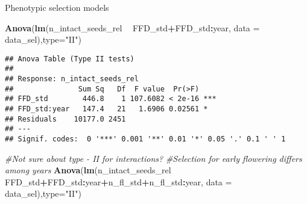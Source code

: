 \documentclass[]{article}
\newenvironment{Shaded}{\begin{snugshade}}{\end{snugshade}}
\newcommand{\KeywordTok}[1]{\textcolor[rgb]{0.13,0.29,0.53}{\textbf{#1}}}
\newcommand{\DataTypeTok}[1]{\textcolor[rgb]{0.13,0.29,0.53}{#1}}
\newcommand{\StringTok}[1]{\textcolor[rgb]{0.31,0.60,0.02}{#1}}
\newcommand{\CommentTok}[1]{\textcolor[rgb]{0.56,0.35,0.01}{\textit{#1}}}
\newcommand{\OperatorTok}[1]{\textcolor[rgb]{0.81,0.36,0.00}{\textbf{#1}}}
\newcommand{\NormalTok}[1]{#1}
\begin{document}
\begin{Shaded}
\end{Shaded}

Phenotypic selection models

\begin{Shaded}
\begin{Highlighting}[]
\KeywordTok{Anova}\NormalTok{(}\KeywordTok{lm}\NormalTok{(n_intact_seeds_rel }\OperatorTok{~}\StringTok{ }\NormalTok{FFD_std}\OperatorTok{+}\NormalTok{FFD_std}\OperatorTok{:}\NormalTok{year, }\DataTypeTok{data =}\NormalTok{ data_sel),}\DataTypeTok{type=}\StringTok{"II"}\NormalTok{) }
\end{Highlighting}
\end{Shaded}

\begin{verbatim}
## Anova Table (Type II tests)
## 
## Response: n_intact_seeds_rel
##               Sum Sq   Df  F value  Pr(>F)    
## FFD_std        446.8    1 107.6082 < 2e-16 ***
## FFD_std:year   147.4   21   1.6906 0.02561 *  
## Residuals    10177.0 2451                     
## ---
## Signif. codes:  0 '***' 0.001 '**' 0.01 '*' 0.05 '.' 0.1 ' ' 1
\end{verbatim}

\begin{Shaded}
\begin{Highlighting}[]
\CommentTok{#Not sure about type - II for interactions?}
\CommentTok{#Selection for early flowering differs among years}
\KeywordTok{Anova}\NormalTok{(}\KeywordTok{lm}\NormalTok{(n_intact_seeds_rel }\OperatorTok{~}\StringTok{ }\NormalTok{FFD_std}\OperatorTok{+}\NormalTok{FFD_std}\OperatorTok{:}\NormalTok{year}\OperatorTok{+}\NormalTok{n_fl_std}\OperatorTok{+}\NormalTok{n_fl_std}\OperatorTok{:}\NormalTok{year, }\DataTypeTok{data =}\NormalTok{ data_sel),}\DataTypeTok{type=}\StringTok{"II"}\NormalTok{)}
\end{Highlighting}
\end{Shaded}
\end{document}
